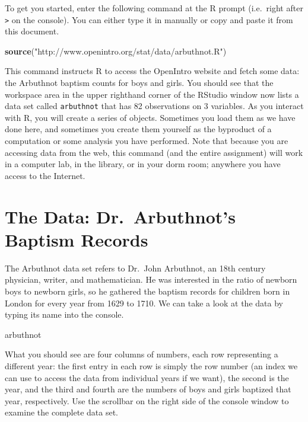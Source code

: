 \documentclass[]{book}
\newenvironment{Shaded}{\begin{snugshade}}{\end{snugshade}}
\newcommand{\KeywordTok}[1]{\textcolor[rgb]{0.13,0.29,0.53}{\textbf{#1}}}
\newcommand{\NormalTok}[1]{#1}
\newcommand{\StringTok}[1]{\textcolor[rgb]{0.31,0.60,0.02}{#1}}
\theoremstyle{definition}
\theoremstyle{definition}
\theoremstyle{definition}
\theoremstyle{remark}
\begin{document}
To get you started, enter the following command at the R prompt
(i.e.~right after \texttt{\textgreater{}} on the console). You can
either type it in manually or copy and paste it from this document.

\begin{Shaded}
\begin{Highlighting}[]
\KeywordTok{source}\NormalTok{(}\StringTok{"http://www.openintro.org/stat/data/arbuthnot.R"}\NormalTok{)}
\end{Highlighting}
\end{Shaded}

This command instructs R to access the OpenIntro website and fetch some
data: the Arbuthnot baptism counts for boys and girls. You should see
that the workspace area in the upper righthand corner of the RStudio
window now lists a data set called \texttt{arbuthnot} that has 82
observations on 3 variables. As you interact with R, you will create a
series of objects. Sometimes you load them as we have done here, and
sometimes you create them yourself as the byproduct of a computation or
some analysis you have performed. Note that because you are accessing
data from the web, this command (and the entire assignment) will work in
a computer lab, in the library, or in your dorm room; anywhere you have
access to the Internet.

\hypertarget{the-data-dr.arbuthnots-baptism-records}{%
\section{The Data: Dr.~Arbuthnot's Baptism
Records}\label{the-data-dr.arbuthnots-baptism-records}}

The Arbuthnot data set refers to Dr.~John Arbuthnot, an 18th century
physician, writer, and mathematician. He was interested in the ratio of
newborn boys to newborn girls, so he gathered the baptism records for
children born in London for every year from 1629 to 1710. We can take a
look at the data by typing its name into the console.

\begin{Shaded}
\begin{Highlighting}[]
\NormalTok{arbuthnot}
\end{Highlighting}
\end{Shaded}

What you should see are four columns of numbers, each row representing a
different year: the first entry in each row is simply the row number (an
index we can use to access the data from individual years if we want),
the second is the year, and the third and fourth are the numbers of boys
and girls baptized that year, respectively. Use the scrollbar on the
right side of the console window to examine the complete data set.
\end{document}
